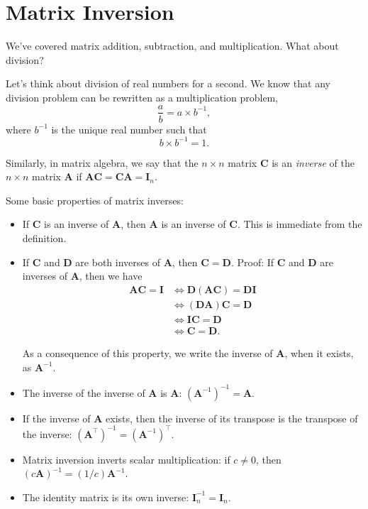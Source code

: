 \documentclass[12pt,oneside,openany]{book}
\begin{document}
\section{Matrix Inversion}\label{matrix-inversion}

We've covered matrix addition, subtraction, and multiplication. What
about division?

Let's think about division of real numbers for a second. We know that
any division problem can be rewritten as a multiplication problem, \[
\frac{a}{b} = a \times b^{-1},
\] where \(b^{-1}\) is the unique real number such that \[
b \times b^{-1} = 1.
\]

Similarly, in matrix algebra, we say that the \(n \times n\) matrix
\(\mathbf{C}\) is an \emph{inverse} of the \(n \times n\) matrix
\(\mathbf{A}\) if
\(\mathbf{A} \mathbf{C} = \mathbf{C} \mathbf{A} = \mathbf{I}_n\).

Some basic properties of matrix inverses:

\begin{itemize}
\item
  If \(\mathbf{C}\) is an inverse of \(\mathbf{A}\), then \(\mathbf{A}\)
  is an inverse of \(\mathbf{C}\). This is immediate from the
  definition.
\item
  If \(\mathbf{C}\) and \(\mathbf{D}\) are both inverses of
  \(\mathbf{A}\), then \(\mathbf{C} = \mathbf{D}\). Proof: If
  \(\mathbf{C}\) and \(\mathbf{D}\) are inverses of \(\mathbf{A}\), then
  we have \[
  \begin{aligned}
  \mathbf{A} \mathbf{C} = \mathbf{I}
  &\Leftrightarrow \mathbf{D} (\mathbf{A} \mathbf{C}) = \mathbf{D} \mathbf{I} \\
  &\Leftrightarrow (\mathbf{D} \mathbf{A}) \mathbf{C} = \mathbf{D} \\
  &\Leftrightarrow \mathbf{I} \mathbf{C} = \mathbf{D} \\
  &\Leftrightarrow \mathbf{C} = \mathbf{D}.
  \end{aligned}
  \]

  As a consequence of this property, we write the inverse of
  \(\mathbf{A}\), when it exists, as \(\mathbf{A}^{-1}\).
\item
  The inverse of the inverse of \(\mathbf{A}\) is \(\mathbf{A}\):
  \((\mathbf{A}^{-1})^{-1} = \mathbf{A}\).
\item
  If the inverse of \(\mathbf{A}\) exists, then the inverse of its
  transpose is the transpose of the inverse:
  \((\mathbf{A}^\top)^{-1} = (\mathbf{A}^{-1})^\top\).
\item
  Matrix inversion inverts scalar multiplication: if \(c \neq 0\), then
  \((c \mathbf{A})^{-1} = (1/c) \mathbf{A}^{-1}\).
\item
  The identity matrix is its own inverse:
  \(\mathbf{I}_n^{-1} = \mathbf{I}_n\).
\end{itemize}
\end{document}
